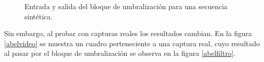 \begin{figure}[H]
        \centering
        \hspace{3 mm}
  \caption{Entrada y salida del bloque de umbralización para una secuencia sintética.}
      \label{resUmbralizacion}
\end{figure}

Sin embargo, al probar con capturas reales los resultados cambian. En la figura \ref{abelvideo} se muestra un cuadro perteneciente a una captura real, cuyo resultado al pasar por el bloque de umbralización se observa en la figura \ref{abelfiltro}. 


